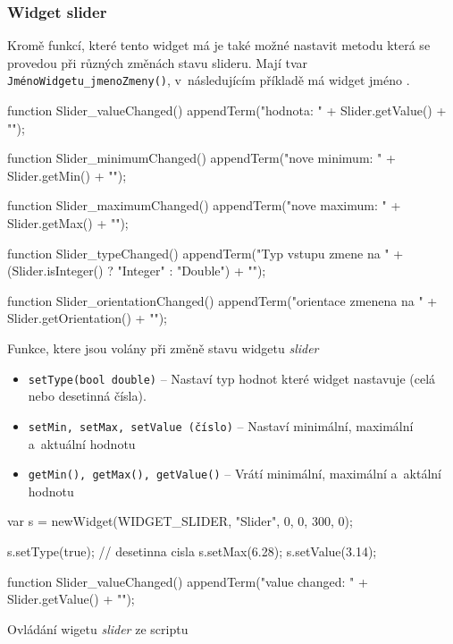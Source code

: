 \documentclass[12pt, a4paper, oneside]{article}
\newcommand{\It}{\textit}  %
\begin{document}
\subsubsection*{Widget slider}
Kromě funkcí, které tento widget má je také možné nastavit metodu která se provedou při různých změnách stavu slideru. Mají tvar  {\color{blue}\verb/JménoWidgetu_jmenoZmeny()/}, v~následujícím příkladě má widget jméno .
\begin{listing}[H]
\begin{jscode}
function Slider_valueChanged() {
    appendTerm("hodnota: " + Slider.getValue() + "\n");
}

function Slider_minimumChanged() {
    appendTerm("nove minimum: " + Slider.getMin() + "\n");
}

function Slider_maximumChanged() {
    appendTerm("nove maximum: " + Slider.getMax() + "\n");
}

function Slider_typeChanged() {
    appendTerm("Typ vstupu zmene na " +
        (Slider.isInteger() ? "Integer" : "Double") + "\n");
}

function Slider_orientationChanged() {
    appendTerm("orientace zmenena na " +
        Slider.getOrientation() + "\n");
}
\end{jscode}
\caption{Funkce, ktere jsou volány při změně stavu widgetu \It{slider}}
\end{listing}
\begin{itemize}
    \item {\color{blue}\verb/setType(bool double)/} -- Nastaví typ hodnot které widget nastavuje (celá nebo desetinná čísla).
    \item {\color{blue}\verb/setMin, setMax, setValue (číslo)/} -- Nastaví minimální, maximální a~aktuální hodnotu
    \item {\color{blue}\verb/getMin(), getMax(), getValue()/} -- Vrátí minimální, maximální a~aktální hodnotu
\end{itemize}

\begin{listing}[H]
\begin{jscode}
var s = newWidget(WIDGET_SLIDER, "Slider", 0, 0, 300, 0);

s.setType(true); // desetinna cisla
s.setMax(6.28);
s.setValue(3.14);

function Slider_valueChanged() {
    appendTerm("value changed: " + Slider.getValue() + "\n");
}
\end{jscode}
\caption{Ovládání wigetu \It{slider} ze scriptu}
\end{listing}
\end{document}
